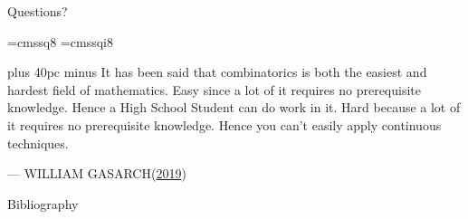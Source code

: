 \documentclass[aspectratio=169]{beamer}
\begin{document}
\begin{frame}{}
      \begin{center}
    {\color{sigma@mainblue} \LARGE Questions?}
  \end{center}
\end{frame}

\font\eightss=cmssq8
\font\eightssi=cmssqi8
\newcommand\quoteAuthorDate[3]{\begingroup
  \baselineskip 10pt
  \parfillskip 0pt
  \interlinepenalty 10000 %
  \leftskip 0pt plus 40pc minus \parindent
  \let\rm=\eightss
  \let\sl=\eightssi
  \everypar{\sl}#1\par
  \nobreak\smallskip
  \noindent\rm--- #2\unskip\enspace(#3)\par
  \endgroup}
\begin{frame}
    \begin{center}
        \item \quoteAuthorDate{It has been said that combinatorics is both the easiest and hardest field of mathematics. Easy since a lot of it requires no prerequisite knowledge. Hence a High School Student can do work in it. Hard because a lot of it requires no prerequisite knowledge. Hence you can’t easily apply continuous techniques.}{WILLIAM GASARCH}{\color{sigma@mainblue}\href{https://www.cs.umd.edu/~gasarch/open/pnpme.pdf}{2019}}
    \end{center}
\end{frame}

\begin{frame}{Bibliography}
    
    {\tiny
    
    }
\end{frame}
\end{document}
